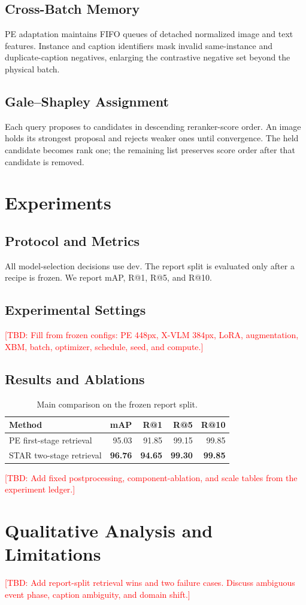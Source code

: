 \documentclass[runningheads]{llncs}
\newcommand{\todo}[1]{\textcolor{red}{[TBD: #1]}}
\begin{document}
\subsection{Cross-Batch Memory}
PE adaptation maintains FIFO queues of detached normalized image and text features. Instance and
caption identifiers mask invalid same-instance and duplicate-caption negatives, enlarging the
contrastive negative set beyond the physical batch.

\subsection{Gale--Shapley Assignment}
Each query proposes to candidates in descending reranker-score order. An image holds its strongest
proposal and rejects weaker ones until convergence. The held candidate becomes rank one; the
remaining list preserves score order after that candidate is removed.

\section{Experiments}
\subsection{Protocol and Metrics}
All model-selection decisions use dev. The report split is evaluated only after a recipe is frozen.
We report mAP, R@1, R@5, and R@10.

\subsection{Experimental Settings}
\todo{Fill from frozen configs: PE 448px, X-VLM 384px, LoRA, augmentation, XBM, batch,
optimizer, schedule, seed, and compute.}

\subsection{Results and Ablations}
\begin{table}[t]
  \centering
  \caption{Main comparison on the frozen report split.}
  \begin{tabular}{lrrrr}
    \toprule
    Method & mAP & R@1 & R@5 & R@10 \\
    \midrule
    PE first-stage retrieval & 95.03 & 91.85 & 99.15 & 99.85 \\
    STAR two-stage retrieval & \textbf{96.76} & \textbf{94.65} & \textbf{99.30} & \textbf{99.85} \\
    \bottomrule
  \end{tabular}
  \label{tab:main}
\end{table}

\todo{Add fixed postprocessing, component-ablation, and scale tables from the experiment ledger.}

\section{Qualitative Analysis and Limitations}
\todo{Add report-split retrieval wins and two failure cases. Discuss ambiguous event phase,
caption ambiguity, and domain shift.}



\end{document}
